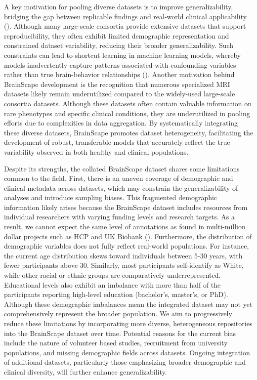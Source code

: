 A key motivation for pooling diverse datasets is to improve generalizability, 
bridging the gap between replicable findings and real-world clinical applicability 
(\cite{marek2024replicability, adkinson2024brain, yang2024limits}).
Although many large-scale consortia provide extensive datasets that support reproducibility, 
they often exhibit limited demographic representation and constrained dataset variability, 
reducing their broader generalizability. 
Such constraints can lead to shortcut learning in machine learning models, 
whereby models inadvertently capture patterns associated with confounding variables 
rather than true brain-behavior relationships (\cite{marek2024replicability, yang2024limits}). 
Another motivation behind BrainScape development is the recognition that 
numerous specialized MRI datasets likely remain underutilized 
compared to the widely-used large-scale consortia datasets. 
Although these datasets often contain valuable information on rare phenotypes and specific clinical conditions, 
they are underutilized in pooling efforts due to complexities in data aggregation. 
By systematically integrating these diverse datasets, BrainScape promotes 
dataset heterogeneity, facilitating the development of robust, transferable models 
that accurately reflect the true variability observed in both healthy and clinical populations.

Despite its strengths, the collated BrainScape dataset shares some limitations common to the field. 
First, there is an uneven coverage of demographic and clinical metadata across datasets, 
which may constrain the generalizability of analyses and introduce sampling biases. 
This fragmented demographic information likely arises because the BrainScape dataset includes resources from individual researchers 
with varying funding levels and research targets. 
As a result, we cannot expect the same level of annotations as found in multi-million dollar projects 
such as HCP and UK Biobank (\cite{van2013wu, miller2016multimodal}).
Furthermore, the distribution of demographic variables does not fully reflect real-world populations. 
For instance, the current age distribution skews toward individuals between 5-30 years, with fewer participants above 30.
Similarly, most participants self-identify as White, while other racial or ethnic groups are comparatively underrepresented. 
Educational levels also exhibit an imbalance with more than half of the participants reporting high-level education (bachelor's, master's, or PhD).
Although these demographic imbalances mean the integrated dataset may not yet comprehensively represent 
the broader population. We aim to progressively reduce 
these limitations by incorporating more diverse, heterogeneous repositories into the BrainScape dataset over time.
Potential reasons for the current bias include the nature of volunteer based studies, 
recruitment from university populations, and missing demographic fields across datasets. 
Ongoing integration of additional datasets, particularly those emphasizing broader demographic 
and clinical diversity, will further enhance generalizability. 


